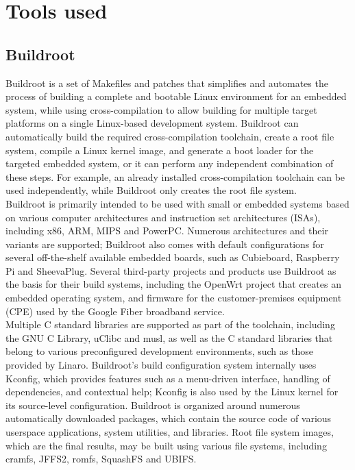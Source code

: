 \section{Tools used}
\subsection{Buildroot}
Buildroot is a set of Makefiles and patches that simplifies and automates the process of building a complete and bootable Linux environment for an embedded system, while using cross-compilation to allow building for multiple target platforms on a single Linux-based development system. Buildroot can automatically build the required cross-compilation toolchain, create a root file system, compile a Linux kernel image, and generate a boot loader for the targeted embedded system, or it can perform any independent combination of these steps. For example, an already installed cross-compilation toolchain can be used independently, while Buildroot only creates the root file system. \\
Buildroot is primarily intended to be used with small or embedded systems based on various computer architectures and instruction set architectures (ISAs), including x86, ARM, MIPS and PowerPC. Numerous architectures and their variants are supported; Buildroot also comes with default configurations for several off-the-shelf available embedded boards, such as Cubieboard, Raspberry Pi and SheevaPlug. Several third-party projects and products use Buildroot as the basis for their build systems, including the OpenWrt project that creates an embedded operating system, and firmware for the customer-premises equipment (CPE) used by the Google Fiber broadband service.\\
Multiple C standard libraries are supported as part of the toolchain, including the GNU C Library, uClibc and musl, as well as the C standard libraries that belong to various preconfigured development environments, such as those provided by Linaro. Buildroot's build configuration system internally uses Kconfig, which provides features such as a menu-driven interface, handling of dependencies, and contextual help; Kconfig is also used by the Linux kernel for its source-level configuration. Buildroot is organized around numerous automatically downloaded packages, which contain the source code of various userspace applications, system utilities, and libraries. Root file system images, which are the final results, may be built using various file systems, including cramfs, JFFS2, romfs, SquashFS and UBIFS.\\
